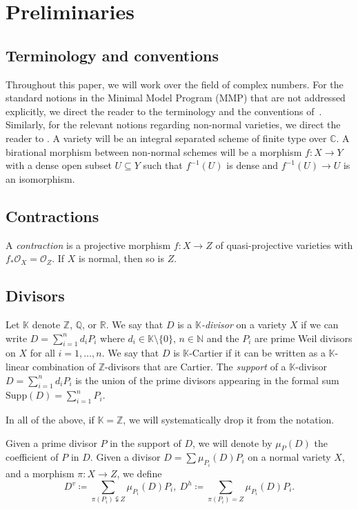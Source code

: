 \documentclass{amsart}
\newcommand{\bC}{\mathbb{C}}
\theoremstyle{definition}
\newcommand{\rar}{\rightarrow}
\def\O#1.{\mathcal {O}_{#1}}
\def\subs#1.{_{#1}}
\renewcommand{\qq}{\mathbb{Q}}
\newcommand{\zz}{\mathbb{Z}}
\newcommand{\nn}{\mathbb{N}}
\newcommand{\rr}{\mathbb{R}}
\begin{document}
\section{Preliminaries} \label{preliminaries}

\subsection{Terminology and conventions}
\label{term.subs}
Throughout this paper, we will work over the field of complex numbers.
For the standard notions in the Minimal Model Program (MMP) that are not addressed explicitly, we direct the reader to the terminology and the conventions of~\cite{KM98}.
Similarly, for the relevant notions regarding non-normal varieties, we direct the reader to \cite{Kol13}.
A variety will be an integral separated scheme of finite type over $\bC$.
A birational morphism between non-normal schemes will be a morphism $f \colon X \to Y$ with a dense open subset $U\subseteq Y$ such that $f^{-1}(U)$ is dense and $f^{-1}(U)\to U$ is an isomorphism.






\subsection{Contractions}
A \emph{contraction} is a projective morphism $f\colon X \rar Z$ of quasi-projective varieties with $f_\ast  \O X. = \O Z.$. 
If $X$ is normal, then so is $Z$.

\subsection{Divisors}
Let $\mathbb{K}$ denote $\zz$, $\qq$, or $\rr$. We say that $D$ is a \emph{$\mathbb{K}$-divisor} on a variety $X$ if we can write $D = \sum \subs i=1. ^n d_i P_i$ where $d_i \in \mathbb{K} \setminus \{ 0\}$, $n \in \nn$ and the $P_i$ are prime Weil divisors on $X$ for all $i=1, \ldots, n$. 
We say that $D$ is $\mathbb{K}$-Cartier if it can be written as a $\mathbb{K}$-linear combination of $\zz$-divisors that are Cartier.
The \textit{support} of a $\mathbb{K}$-divisor $D=\sum_{i=1}^n d_iP_i$ is the union of the prime divisors appearing in the formal sum $\mathrm{Supp}(D)= \sum_{i=1}^n P_i$.

In all of the above, if $\mathbb{K}= \zz$, we will systematically drop it from the notation.

Given a prime divisor $P$ in the support of $D$, we will denote by $\mu_P (D)$ the coefficient of $P$ in $D$.
Given a divisor $D = \sum \mu_{P_i}(D) P_i$ on a normal variety $X$, and a morphism $\pi \colon X \to Z$, we define
\[
D^v \coloneqq \sum_{\pi(P_i) \subsetneqq Z} \mu_{P_i}(D) P_i, \
D^h \coloneqq \sum_{\pi(P_i) = Z} \mu_{P_i}(D) P_i.
\]
\end{document}
